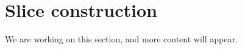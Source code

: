 \section{Slice construction}

\begin{publictodo}We are working on this section, and more content will appear.\end{publictodo}

